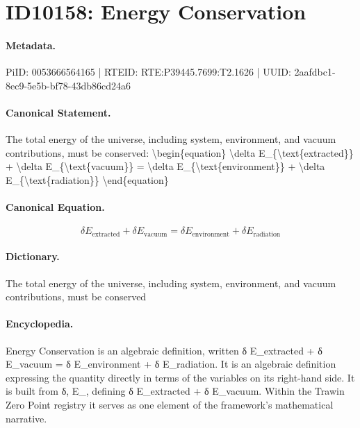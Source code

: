 \section*{ID10158: Energy Conservation}
\paragraph{Metadata.}
PiID: 0053666564165 | RTEID: RTE:P39445.7699:T2.1626 | UUID: 2aafdbc1-8ec9-5e5b-bf78-43db86cd24a6

\paragraph{Canonical Statement.}
The total energy of the universe, including system, environment, and vacuum contributions, must be conserved: \textbackslash{}begin\{equation\} \textbackslash{}delta E\_\{\textbackslash{}text\{extracted\}\} + \textbackslash{}delta E\_\{\textbackslash{}text\{vacuum\}\} = \textbackslash{}delta E\_\{\textbackslash{}text\{environment\}\} + \textbackslash{}delta E\_\{\textbackslash{}text\{radiation\}\} \textbackslash{}end\{equation\}

\paragraph{Canonical Equation.}
\[
\delta E_{\text{extracted}} + \delta E_{\text{vacuum}} = \delta E_{\text{environment}} + \delta E_{\text{radiation}}
\]

\paragraph{Dictionary.}
The total energy of the universe, including system, environment, and vacuum contributions, must be conserved

\paragraph{Encyclopedia.}
Energy Conservation is an algebraic definition, written δ E\_extracted + δ E\_vacuum = δ E\_environment + δ E\_radiation. It is an algebraic definition expressing the quantity directly in terms of the variables on its right-hand side. It is built from δ, E\_, defining δ E\_extracted + δ E\_vacuum. Within the Trawin Zero Point registry it serves as one element of the framework's mathematical narrative.
